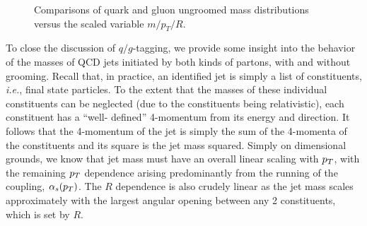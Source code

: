 \begin{figure}
\centering
{}
\caption{Comparisons of quark and gluon ungroomed mass distributions versus the scaled variable $m/p_T/R$. }
\label{fig:qg_masses_log}
\end{figure}

To close the discussion of $q/g$-tagging, we provide some insight into the behavior of the masses of QCD jets initiated by both kinds of partons,
 with and without grooming.  Recall that, in practice, an
identified jet is simply a list of constituents, \textit{i.e.}, final
state particles.  To the extent
that the masses of these individual constituents can be neglected (due to the constituents being relativistic), each constituent has a ``well-
defined'' 4-momentum from its energy and direction.  It follows that the 4-momentum of the jet  is simply the sum of the 4-momenta of the constituents and its square is the jet mass squared.
Simply on dimensional grounds,
we know that jet mass must have an overall linear scaling with $p_T$, with the remaining $p_T$ dependence arising predominantly from the running of the coupling,
$\alpha_s(p_T)$.  The $R$ dependence is also crudely linear as the jet mass scales approximately with the largest angular opening between any 2 constituents,
which is set by $R$.

